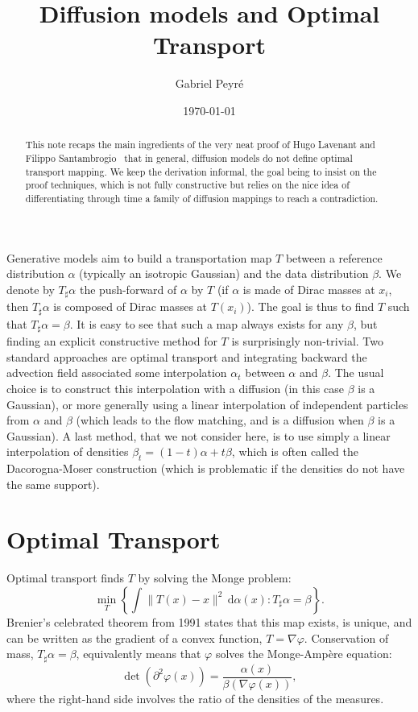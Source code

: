 \documentclass{article}
\title{Diffusion models and Optimal Transport}
\author{Gabriel Peyr\'e}
\date{\today}
\begin{document}
\maketitle

\begin{abstract}
	This note recaps the main ingredients of the very neat proof of Hugo Lavenant and Filippo Santambrogio~\cite{LavenantSantambrogio20} that in general, diffusion models do not define optimal transport mapping. We keep the derivation informal, the goal being to insist on the proof techniques, which is not fully constructive but relies on the nice idea of differentiating through time a family of diffusion mappings to reach a contradiction.
\end{abstract}

Generative models aim to build a transportation map $T$ between a reference distribution $\alpha$ (typically an isotropic Gaussian) and the data distribution $\beta$.
%
We denote by $T_\sharp \alpha$ the push-forward of $\alpha$ by $T$ (if $\alpha$ is made of Dirac masses at $x_i$, then $T_\sharp \alpha$ is composed of Dirac masses at $T(x_i)$). The goal is thus to find $T$ such that $T_\sharp \alpha = \beta$.
%
It is easy to see that such a map always exists for any $\beta$, but finding an explicit constructive method for $T$ is surprisingly non-trivial. Two standard approaches are optimal transport and integrating backward the advection field associated some interpolation $\alpha_t$ between $\alpha$ and $\beta$. The usual choice is to construct this interpolation with a diffusion (in this case $\beta$ is a Gaussian), or more generally using a linear interpolation of independent particles from $\alpha$ and $\beta$ (which leads to the flow matching, and is a diffusion when $\beta$ is a Gaussian).
%
A last method, that we not consider here, is to use simply a linear interpolation of densities $\beta_t = (1-t)\alpha+t \beta$, which is often called the Dacorogna-Moser construction (which is problematic if the densities do not have the same support). 

\section{Optimal Transport}

Optimal transport finds $T$ by solving the Monge problem:
\begin{equation}\label{eq:monge}
    \min_T \left\{ \int \|T(x) - x\|^2 \, \mathrm{d}\alpha(x) : T_\sharp \alpha = \beta \right\}. 
\end{equation}
Brenier's celebrated theorem from 1991 states that this map exists, is unique, and can be written as the gradient of a convex function, $T = \nabla \varphi$. Conservation of mass, $T_\sharp \alpha = \beta$, equivalently means that $\varphi$ solves the Monge-Ampère equation:
\begin{equation}\label{eq:monge-ampere}
    \det(\partial^2 \varphi(x)) = \frac{\alpha(x)}{\beta(\nabla \varphi(x))}, 
\end{equation}
where the right-hand side involves the ratio of the densities of the measures. 
\end{document}

